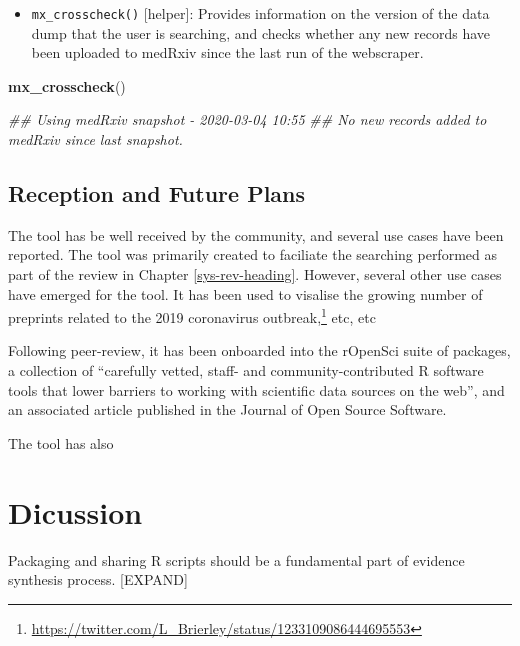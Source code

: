 \documentclass[a4paper, nobind]{templates/ociamthesis}
\providecommand{\tightlist}{%
  \setlength{\itemsep}{0pt}\setlength{\parskip}{0pt}}
\newenvironment{Shaded}{\begin{snugshade}}{\end{snugshade}}
\newcommand{\CommentTok}[1]{\textcolor[rgb]{0.56,0.35,0.01}{\textit{#1}}}
\newcommand{\KeywordTok}[1]{\textcolor[rgb]{0.13,0.29,0.53}{\textbf{#1}}}
\newcommand{\NormalTok}[1]{#1}
\renewenvironment{Shaded}
{
  \vspace{4pt}%
  \begin{snugshade}%
}{%
  \end{snugshade}%
  \vspace{4pt}%
}
\begin{document}
\begin{itemize}
\tightlist
\item
  \texttt{mx\_crosscheck()} {[}helper{]}: Provides information on the version of the data dump that the user is searching, and checks whether any new records have been uploaded to medRxiv since the last run of the webscraper.
\end{itemize}

\begin{Shaded}
\begin{Highlighting}[]
\KeywordTok{mx_crosscheck}\NormalTok{()}

\CommentTok{## Using medRxiv snapshot - 2020-03-04 10:55}
\CommentTok{## No new records added to medRxiv since last snapshot.}
\end{Highlighting}
\end{Shaded}

\hypertarget{reception-and-future-plans-1}{%
\subsection{Reception and Future Plans}\label{reception-and-future-plans-1}}

The tool has be well received by the community, and several use cases have been reported. The tool was primarily created to faciliate the searching performed as part of the review in Chapter \ref{sys-rev-heading}. However, several other use cases have emerged for the tool. It has been used to visalise the growing number of preprints related to the 2019 coronavirus outbreak,\footnote{\url{https://twitter.com/L_Brierley/status/1233109086444695553}} etc, etc

Following peer-review, it has been onboarded into the rOpenSci suite of packages, a collection of ``carefully vetted, staff- and community-contributed R software tools that lower barriers to working with scientific data sources on the web'', and an associated article published in the Journal of Open Source Software.

The tool has also

\hypertarget{dicussion}{%
\section{Dicussion}\label{dicussion}}

Packaging and sharing R scripts should be a fundamental part of evidence synthesis process. {[}EXPAND{]}
\end{document}
